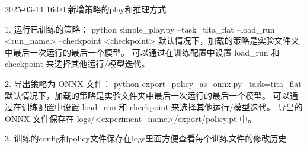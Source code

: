 2025-03-14 16:00
    新增策略的play和推理方式

        1. 运行已训练的策略：
            python simple_play.py --task=tita_flat --load_run <run_name> --checkpoint <checkpoint>
            默认情况下，加载的策略是实验文件夹中最后一次运行的最后一个模型。
            可以通过在训练配置中设置 load_run 和 checkpoint 来选择其他运行/模型迭代。

        2. 导出策略为 ONNX 文件：
            python export_policy_as_onnx.py --task=tita_flat
            默认情况下，加载的策略是实验文件夹中最后一次运行的最后一个模型。
            可以通过在训练配置中设置 load_run 和 checkpoint 来选择其他运行/模型迭代。
            导出的 ONNX 文件保存在 logs/<experiment_name>/export/policy.pt 中。

        3. 训练的config和policy文件保存在logs里面方便查看每个训练文件的修改历史

        